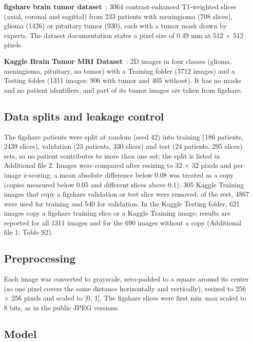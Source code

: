 \documentclass[pdflatex,sn-vancouver-num,iicol]{sn-jnl}
\begin{document}
\textbf{figshare brain tumor dataset}~\cite{cheng2015,cheng2016,cheng2017figshare}: 3064 contrast-enhanced T1-weighted slices (axial, coronal and sagittal) from 233 patients with meningioma (708 slices), glioma (1426) or pituitary tumor (930), each with a tumor mask drawn by experts. The dataset documentation states a pixel size of 0.49 mm at 512 $\times$ 512 pixels.

\textbf{Kaggle Brain Tumor MRI Dataset}~\cite{nickparvar2021kaggle}: 2D images in four classes (glioma, meningioma, pituitary, no tumor) with a Training folder (5712 images) and a Testing folder (1311 images: 906 with tumor and 405 without). It has no masks and no patient identifiers, and part of its tumor images are taken from figshare.

\subsection{Data splits and leakage control}

The figshare patients were split at random (seed 42) into training (186 patients, 2439 slices), validation (23 patients, 330 slices) and test (24 patients, 295 slices) sets, so no patient contributes to more than one set; the split is listed in Additional file 2. Images were compared after resizing to 32 $\times$ 32 pixels and per-image z-scoring; a mean absolute difference below 0.08 was treated as a copy (copies measured below 0.05 and different slices above 0.1). 305 Kaggle Training images that copy a figshare validation or test slice were removed; of the rest, 4867 were used for training and 540 for validation. In the Kaggle Testing folder, 621 images copy a figshare training slice or a Kaggle Training image; results are reported for all 1311 images and for the 690 images without a copy (Additional file 1: Table S2).

\subsection{Preprocessing}

Each image was converted to grayscale, zero-padded to a square around its center (so one pixel covers the same distance horizontally and vertically), resized to 256 $\times$ 256 pixels and scaled to [0, 1]. The figshare slices were first min--max scaled to 8 bits, as in the public JPEG versions.

\subsection{Model}
\end{document}
